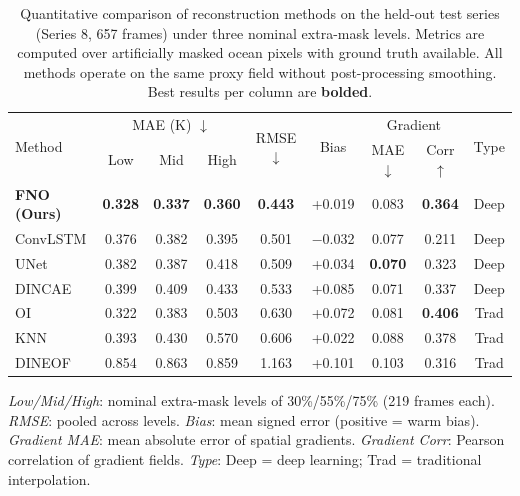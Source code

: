 
\begin{table}[htbp]
\centering
\caption{Quantitative comparison of reconstruction methods on the held-out test series (Series 8, 657 frames) under three nominal extra-mask levels. Metrics are computed over artificially masked ocean pixels with ground truth available. All methods operate on the same proxy field without post-processing smoothing. Best results per column are \textbf{bolded}.}
\label{tab:main_results}
\small
\begin{tabular}{@{}lcccccccc@{}}
\toprule
\multirow{2}{*}{Method} & \multicolumn{3}{c}{MAE (K) $\downarrow$} & \multirow{2}{*}{RMSE $\downarrow$} & \multirow{2}{*}{Bias} & \multicolumn{2}{c}{Gradient} & \multirow{2}{*}{Type} \\
\cmidrule(lr){2-4} \cmidrule(lr){7-8}
& Low & Mid & High & & & MAE $\downarrow$ & Corr $\uparrow$ & \\
\midrule
\textbf{FNO (Ours)} & \textbf{0.328} & \textbf{0.337} & \textbf{0.360} & \textbf{0.443} & +0.019 & 0.083 & \textbf{0.364} & Deep \\
ConvLSTM & 0.376 & 0.382 & 0.395 & 0.501 & $-$0.032 & 0.077 & 0.211 & Deep \\
UNet & 0.382 & 0.387 & 0.418 & 0.509 & +0.034 & \textbf{0.070} & 0.323 & Deep \\
DINCAE & 0.399 & 0.409 & 0.433 & 0.533 & +0.085 & 0.071 & 0.337 & Deep \\
\midrule
OI & 0.322 & 0.383 & 0.503 & 0.630 & +0.072 & 0.081 & \textbf{0.406} & Trad \\
KNN & 0.393 & 0.430 & 0.570 & 0.606 & +0.022 & 0.088 & 0.378 & Trad \\
DINEOF & 0.854 & 0.863 & 0.859 & 1.163 & +0.101 & 0.103 & 0.316 & Trad \\
\bottomrule
\end{tabular}

\vspace{0.5em}
\footnotesize
\textit{Low/Mid/High}: nominal extra-mask levels of 30\%/55\%/75\% (219 frames each). \textit{RMSE}: pooled across levels. \textit{Bias}: mean signed error (positive = warm bias). \textit{Gradient MAE}: mean absolute error of spatial gradients. \textit{Gradient Corr}: Pearson correlation of gradient fields. \textit{Type}: Deep = deep learning; Trad = traditional interpolation.
\end{table}
